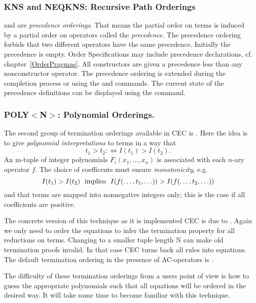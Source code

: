 \subsubsection{KNS and NEQKNS: Recursive Path Orderings}
\label{kns}

 and  are {\it precedence orderings}. That means the partial order on terms is
induced by a partial order on operators called the {\it precedence}. 
The precedence ordering  forbids that two different operators have the same
precedence. Initially the
precedence is empty. Order Specifications may include precedence declarations, cf. 
chapter~\ref{OrderPragmas}. 
All constructors are given a precedence less than any nonconstructor operator.
The precedence ordering is extended during 
the completion process or using the  and 
commands. The current state of the precedence definitions can be
displayed using the  command.

\subsubsection{POLY$<$N$>$: Polynomial Orderings.}
\label{poly}

The second group of termination orderings available in CEC is . Here the idea is to
give {\it polynomial interpretations} to terms in a way that
\[t_1 > t_2 : \iff I(t_1) > I(t_2). \]
An m-tuple of integer polynomials $F_i(x_1, \ldots, x_n)$ is associated with
each $n$-ary operator $f$. The choice of coefficents must ensure {\it monotonicity},
e.g.
\[
I(t_1 ) > I(t_2 )\ \  {\rm implies}\ \  I(f(\ldots, t_1, \ldots)) >
I(f(\ldots, t_2, \ldots)) \]
and that terms are mapped into nonnegative integers only; this is the case if all
coefficients are positive.

The concrete version of this technique as it is implemented CEC is due to \cite{CL86}. Again
we only need to order the equations to infer the termination property for all
reductions on terms. 
Changing to a smaller tuple length {\rm N} can
make old termination proofs invalid. In that case CEC turns back all rules
into equations. The default termination ordering in the presence of AC-operators
is .

The difficulty of these termination orderings from a users point of view is how to
guess the appropriate polynomials such that all equations will be ordered in the
desired way. It will take some time to become familiar with this technique.\bigskip


